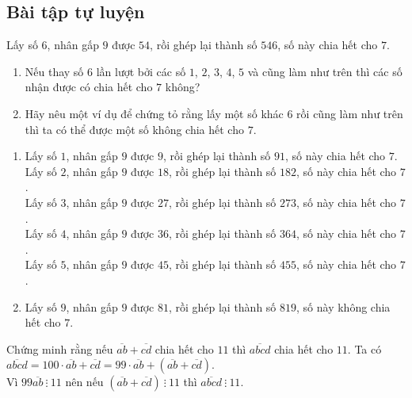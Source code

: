 \subsection{Bài tập tự luyện}
\begin{bt}%
 Lấy số $6$, nhân gấp $9$ được $54$, rồi ghép lại thành số $546$, số này chia hết cho $7$.
 \begin{enumerate}
  \item Nếu thay số $6$ lần lượt bởi các số $1$, $2$, $3$, $4$, $5$ và cũng làm như trên thì các số nhận được có chia hết cho $7$ không?
  \item Hãy nêu một ví dụ để chứng tỏ rằng lấy một số khác $6$ rồi cũng làm như trên thì ta có thể được một số không chia hết cho $7$.
 \end{enumerate}
 \loigiai
  {
  \begin{enumerate}
   \item Lấy số $1$, nhân gấp $9$ được $9$, rồi ghép lại thành số $91$, số này chia hết cho $7$.\\
   Lấy số $2$, nhân gấp $9$ được $18$, rồi ghép lại thành số $182$, số này chia hết cho $7$.\\
   Lấy số $3$, nhân gấp $9$ được $27$, rồi ghép lại thành số $273$, số này chia hết cho $7$.\\
   Lấy số $4$, nhân gấp $9$ được $36$, rồi ghép lại thành số $364$, số này chia hết cho $7$.\\
   Lấy số $5$, nhân gấp $9$ được $45$, rồi ghép lại thành số $455$, số này chia hết cho $7$.
   \item Lấy số $9$, nhân gấp $9$ được $81$, rồi ghép lại thành số $819$, số này không chia hết cho $7$.
  \end{enumerate}
  }
\end{bt}

\begin{bt}%
 Chứng minh rằng nếu $\overline{ab}+\overline{cd}$ chia hết cho $11$ thì $\overline{abcd}$ chia hết cho $11$.
 \loigiai
  {
  Ta có $\overline{abcd}=100 \cdot \overline{ab} + \overline{cd} = 99\cdot \overline{ab} + \left(\overline{ab} + \overline{cd}\right)$.\\
  Vì $99\overline{ab}\ \vdots\ 11$ nên nếu $\left(\overline{ab}+\overline{cd}\right)\ \vdots\ 11$ thì $\overline{abcd}\ \vdots\ 11$.
  }
\end{bt}

